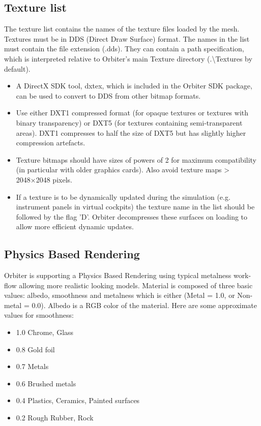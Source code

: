 \documentclass[Orbiter Developer Manual.tex]{subfiles}
\begin{document}
\subsection{Texture list}
The texture list contains the names of the texture files loaded by the mesh. Textures must be in DDS (Direct Draw Surface) format. The names in the list must contain the file extension (.dds). They can contain a path specification, which is interpreted relative to Orbiter's main Texture directory (.\textbackslash Textures by default).

\begin{itemize}
\item A DirectX SDK tool, dxtex, which is included in the Orbiter SDK package, can be used to convert to DDS from other bitmap formats.
\item Use either DXT1 compressed format (for opaque textures or textures with binary transparency) or DXT5 (for textures containing semi-transparent areas). DXT1 compresses to half the size of DXT5 but has slightly higher compression artefacts.
\item Texture bitmaps should have sizes of powers of 2 for maximum compatibility (in particular with older graphics cards). Also avoid texture maps > 2048×2048 pixels.
\item If a texture is to be dynamically updated during the simulation (e.g. instrument panels in virtual cockpits) the texture name in the list should be followed by the flag 'D'. Orbiter decompresses these surfaces on loading to allow more efficient dynamic updates.
\end{itemize}

\subsection{Physics Based Rendering}
Orbiter is supporting a Physics Based Rendering using typical metalness work-flow allowing more realistic looking models. Material is composed of three basic values: albedo, smoothness and metalness which is either (Metal = 1.0, or Non-metal = 0.0). Albedo is a RGB color of the material. Here are some approximate values for smoothness:

\begin{itemize}
\item	1.0 Chrome, Glass
\item	0.8 Gold foil
\item	0.7 Metals
\item 0.6 Brushed metals
\item	0.4 Plastics, Ceramics, Painted surfaces
\item	0.2 Rough Rubber, Rock
\end{itemize}
\break
\end{document}

